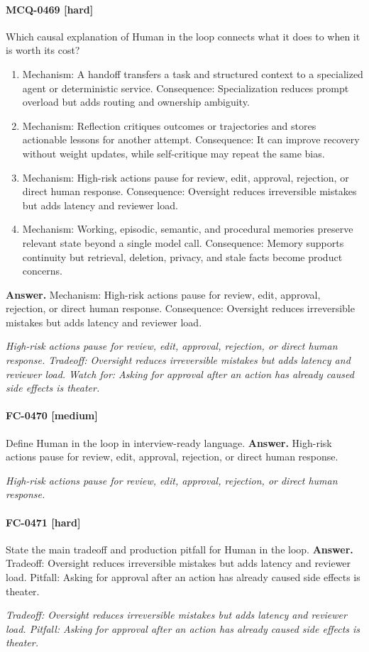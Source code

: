 \paragraph{MCQ-0469 [hard]} Which causal explanation of Human in the loop connects what it does to when it is worth its cost?
\begin{enumerate}[label=\Alph*.]
\item Mechanism: A handoff transfers a task and structured context to a specialized agent or deterministic service. Consequence: Specialization reduces prompt overload but adds routing and ownership ambiguity.
\item Mechanism: Reflection critiques outcomes or trajectories and stores actionable lessons for another attempt. Consequence: It can improve recovery without weight updates, while self-critique may repeat the same bias.
\item Mechanism: High-risk actions pause for review, edit, approval, rejection, or direct human response. Consequence: Oversight reduces irreversible mistakes but adds latency and reviewer load.
\item Mechanism: Working, episodic, semantic, and procedural memories preserve relevant state beyond a single model call. Consequence: Memory supports continuity but retrieval, deletion, privacy, and stale facts become product concerns.
\end{enumerate}
\noindent\textbf{Answer.} Mechanism: High-risk actions pause for review, edit, approval, rejection, or direct human response. Consequence: Oversight reduces irreversible mistakes but adds latency and reviewer load.
\par\textit{High-risk actions pause for review, edit, approval, rejection, or direct human response. Tradeoff: Oversight reduces irreversible mistakes but adds latency and reviewer load. Watch for: Asking for approval after an action has already caused side effects is theater.}
\paragraph{FC-0470 [medium]} Define Human in the loop in interview-ready language.
\noindent\textbf{Answer.} High-risk actions pause for review, edit, approval, rejection, or direct human response.
\par\textit{High-risk actions pause for review, edit, approval, rejection, or direct human response.}
\paragraph{FC-0471 [hard]} State the main tradeoff and production pitfall for Human in the loop.
\noindent\textbf{Answer.} Tradeoff: Oversight reduces irreversible mistakes but adds latency and reviewer load. Pitfall: Asking for approval after an action has already caused side effects is theater.
\par\textit{Tradeoff: Oversight reduces irreversible mistakes but adds latency and reviewer load. Pitfall: Asking for approval after an action has already caused side effects is theater.}

